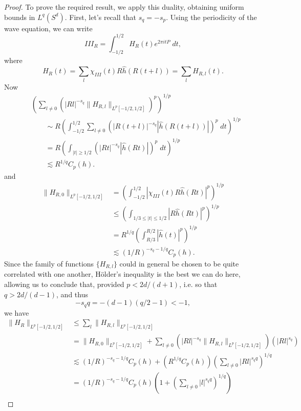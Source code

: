 \begin{proof}
    To prove the required result, we apply this duality, obtaining uniform bounds in $L^q(S^d)$. First, let's recall that $s_q = - s_p$. Using the periodicity of the wave equation, we can write
    \[ III_R = \int_{-1/2}^{1/2} H_R(t) e^{2 \pi i t P}\; dt, \]
    where
    \[ H_R(t) = \sum_l \chi_{III}(t) R \widehat{h}(R(t + l)) = \sum_l H_{R,l}(t). \]
    Now
    \begin{align*}
        &\left( \sum_{l \neq 0} \left( |Rl|^{-s_q} \| H_{R,l} \|_{L^p[-1/2,1/2]} \right)^p \right)^{1/p}\\
        &\quad\quad \sim R \left( \int_{-1/2}^{1/2} \sum_{l \neq 0} \left( |R(t + l)|^{-s_q} |\widehat{h}(R(t + l))| \right)^p\; dt \right)^{1/p}\\
        &\quad\quad = R \left( \int_{|t| \geq 1/2} \left( |Rt|^{-s_q} |\widehat{h}(Rt)| \right)^p\; dt \right)^{1/p} \\
        &\quad\quad\lesssim R^{1/q} C_p(h).
    \end{align*}
    and
    \begin{align*}
        \| H_{R,0} \|_{L^p[-1/2,1/2]} &= \left( \int_{-1/2}^{1/2} |\chi_{III}(t) R \widehat{h}(Rt)|^p \right)^{1/p}\\
        &\leq \left( \int_{1/3 \leq |t| \leq 1/2} |R \widehat{h}(Rt)|^p \right)^{1/p}\\
        &= R^{1/q} \left( \int_{R/3}^{R/2} |\widehat{h}(t)|^p \right)^{1/p}\\
        &\lesssim (1/R)^{-s_q - 1/q} C_p(h).
    \end{align*}
    Since the family of functions $\{ H_{R,l} \}$ could in general be chosen to be quite correlated with one another, H\"{o}lder's inequality is the best we can do here, allowing us to conclude that, provided $p < 2d/(d+1)$, i.e. so that $q > 2d/(d-1)$, and thus
    \[ - s_q q = - (d-1)(q/2 - 1) < -1, \]
    we have
    \begin{align*}
        \| H_R \|_{L^p[-1/2,1/2]} &\leq \sum_l \| H_{R,l} \|_{L^p[-1/2,1/2]}\\
        &= \| H_{R,0} \|_{L^p[-1/2,1/2]} + \sum_{l \neq 0} \left( |Rl|^{-s_q} \| H_{R,l} \|_{L^p[-1/2,1/2]} \right) \left( |Rl|^{s_q} \right)\\
        &\lesssim (1/R)^{-s_q - 1/q} C_p(h) + ( R^{1/q} C_p(h) ) \left( \sum_{l \neq 0} |Rl|^{s_q q} \right)^{1/q}\\
        &= (1/R)^{-s_q - 1/q} C_p(h) \left( 1 + \left( \sum_{l \neq 0} |l|^{s_q q} \right)^{1/q} \right)\\

\end{align*}
\end{proof}

